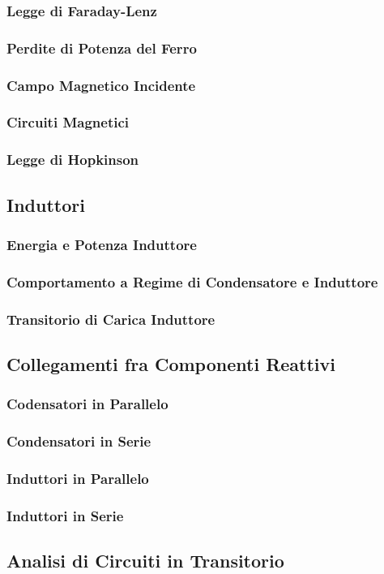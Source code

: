 \documentclass[../main.tex]{subfiles}
\begin{document}
	\subsubsection{Legge di Faraday-Lenz}
	\subsubsection{Perdite di Potenza del Ferro}
	\subsubsection{Campo Magnetico Incidente}
	\subsubsection{Circuiti Magnetici}
	\subsubsection{Legge di Hopkinson}
	\subsection{Induttori}
	\subsubsection{Energia e Potenza Induttore}
	\subsubsection{Comportamento a Regime di Condensatore e Induttore}
	\subsubsection{Transitorio di Carica Induttore}
	\subsection{Collegamenti fra Componenti Reattivi}
	\subsubsection{Codensatori in Parallelo}
	\subsubsection{Condensatori in Serie}
	\subsubsection{Induttori in Parallelo}
	\subsubsection{Induttori in Serie}
	\subsection{Analisi di Circuiti in Transitorio}
\end{document}
